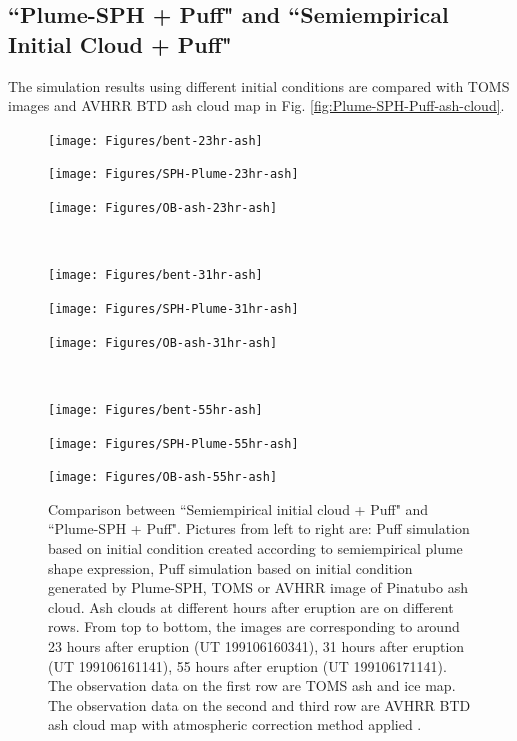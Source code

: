 \documentclass[draft,linenumbers]{agujournal2019}
\begin{document}
\subsection{``Plume-SPH + Puff" and ``Semiempirical Initial Cloud + Puff"}

The simulation results using different initial conditions are compared with TOMS images and AVHRR BTD ash cloud map in Fig. \ref{fig:Plume-SPH-Puff-ash-cloud}.

\begin{figure}[!htb]
    \centering
    \begin{minipage}{.325\textwidth}
        \centering
        \texttt{[image: Figures/bent-23hr-ash]}
    \end{minipage}%
    \begin{minipage}{.325 \textwidth}
        \centering
        \texttt{[image: Figures/SPH-Plume-23hr-ash]}
    \end{minipage}%
    \begin{minipage}{.325 \textwidth}
        \centering
        \texttt{[image: Figures/OB-ash-23hr-ash]}
    \end{minipage}%
    \\
        \begin{minipage}{.325\textwidth}
        \centering
        \texttt{[image: Figures/bent-31hr-ash]}
    \end{minipage}%
    \begin{minipage}{.325 \textwidth}
        \centering
        \texttt{[image: Figures/SPH-Plume-31hr-ash]}
    \end{minipage}%
    \begin{minipage}{.325 \textwidth}
        \centering
        \texttt{[image: Figures/OB-ash-31hr-ash]}
    \end{minipage}%
    \\
        \begin{minipage}{.325\textwidth}
        \centering
        \texttt{[image: Figures/bent-55hr-ash]}
    \end{minipage}%
    \begin{minipage}{.325 \textwidth}
        \centering
        \texttt{[image: Figures/SPH-Plume-55hr-ash]}
    \end{minipage}%
    \begin{minipage}{.325 \textwidth}
        \centering
        \texttt{[image: Figures/OB-ash-55hr-ash]}
    \end{minipage}%
    \caption{Comparison between ``Semiempirical initial cloud + Puff" and ``Plume-SPH + Puff". Pictures from left to right are: Puff simulation based on initial condition created according to semiempirical plume shape expression, Puff simulation based on initial condition generated by Plume-SPH, TOMS or AVHRR image of Pinatubo ash cloud. Ash clouds at different hours after eruption are on different rows. From top to bottom, the images are corresponding to around 23 hours after eruption (UT 199106160341), 31 hours after eruption (UT 199106161141), 55 hours after eruption (UT 199106171141). The observation data on the first row are TOMS ash and ice map. The observation data on the second and third row are AVHRR BTD ash cloud map with atmospheric correction method applied \citep{guo2004particles}.}

\end{figure}
\end{document}
